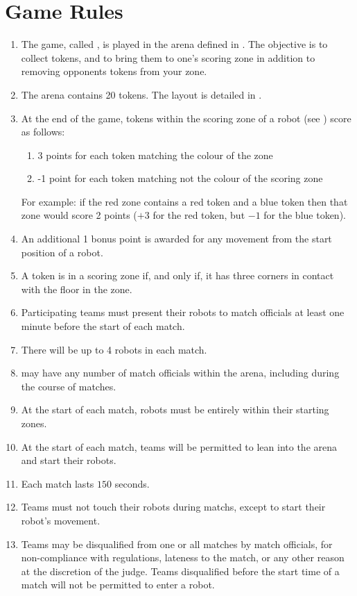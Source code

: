 \section{Game Rules}
\label{sec:rules}

\begin{enumerate}
  \item The game, called \emph{\gamename}, is played in the arena defined in
        . The objective is to collect tokens, and to bring
        them to one's scoring zone in addition to removing opponents tokens from
        your zone.
  \item The arena contains 20 tokens. The layout is detailed in
        .
  \item At the end of the game, tokens within the scoring zone of a robot (see
        ) score as follows:
    \begin{enumerate}
      \item 3 points for each token matching the colour of the zone
      \item -1 point for each token matching not the colour of the scoring zone
    \end{enumerate}
        For example: if the red zone contains a red token and a blue token then
        that zone would score 2 points ($+3$ for the red token, but $-1$ for the
        blue token).
  \item An additional 1 bonus point is awarded for any movement from the
        start position of a robot.
  \item \label{rules:token}A token is in a scoring zone if, and only if, it
        has three corners in contact with the floor in the zone.
  \item Participating teams must present their robots to match officials at
        least one minute before the start of each match.
  \item There will be up to 4 robots in each match.
  \item \org may have any number of match officials within the arena, including
        during the course of matches.
  \item At the start of each match, robots must be entirely within their
        starting zones.
  \item At the start of each match, teams will be permitted to lean into the
        arena and start their robots.
  \item Each match lasts $150$ seconds.
  \item Teams must not touch their robots during matchs, except to start their
        robot's movement.
  \item Teams may be disqualified from one or all matches by match officials,
        for non-compliance with regulations, lateness to the match, or any other
        reason at the discretion of the judge. Teams disqualified before the
        start time of a match will not be permitted to enter a robot.
\end{enumerate}
